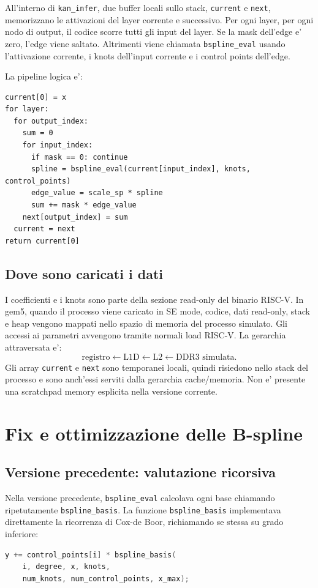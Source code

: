 \documentclass[conference]{IEEEtran}
\begin{document}
All'interno di \texttt{kan\_infer}, due buffer locali sullo stack, \texttt{current} e \texttt{next}, memorizzano le attivazioni del layer corrente e successivo. Per ogni layer, per ogni nodo di output, il codice scorre tutti gli input del layer. Se la mask dell'edge e' zero, l'edge viene saltato. Altrimenti viene chiamata \texttt{bspline\_eval} usando l'attivazione corrente, i knots dell'input corrente e i control points dell'edge.

La pipeline logica e':
\begin{lstlisting}
current[0] = x
for layer:
  for output_index:
    sum = 0
    for input_index:
      if mask == 0: continue
      spline = bspline_eval(current[input_index], knots, control_points)
      edge_value = scale_sp * spline
      sum += mask * edge_value
    next[output_index] = sum
  current = next
return current[0]
\end{lstlisting}

\subsection{Dove sono caricati i dati}
I coefficienti e i knots sono parte della sezione read-only del binario RISC-V. In gem5, quando il processo viene caricato in SE mode, codice, dati read-only, stack e heap vengono mappati nello spazio di memoria del processo simulato. Gli accessi ai parametri avvengono tramite normali load RISC-V. La gerarchia attraversata e':
\begin{equation}
\text{registro} \leftarrow \text{L1D} \leftarrow \text{L2} \leftarrow \text{DDR3 simulata}.
\end{equation}
Gli array \texttt{current} e \texttt{next} sono temporanei locali, quindi risiedono nello stack del processo e sono anch'essi serviti dalla gerarchia cache/memoria. Non e' presente una scratchpad memory esplicita nella versione corrente.

\section{Fix e ottimizzazione delle B-spline}
\subsection{Versione precedente: valutazione ricorsiva}
Nella versione precedente, \texttt{bspline\_eval} calcolava ogni base chiamando ripetutamente \texttt{bspline\_basis}. La funzione \texttt{bspline\_basis} implementava direttamente la ricorrenza di Cox-de Boor, richiamando se stessa su grado inferiore:
\begin{lstlisting}[language=C]
y += control_points[i] * bspline_basis(
    i, degree, x, knots,
    num_knots, num_control_points, x_max);
\end{lstlisting}
\end{document}
